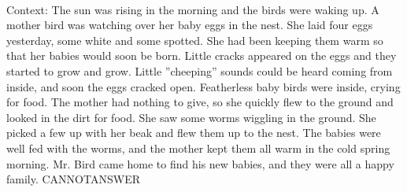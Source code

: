 \documentclass[11pt,a4paper, onecolumn]{article}
\begin{document}
\\ Context: The sun was rising in the morning and the birds were waking up. A mother bird was watching over her baby eggs in the nest. She laid four eggs yesterday, some white and some spotted. She had been keeping them warm so that her babies would soon be born. Little cracks appeared on the eggs and they started to grow and grow. Little ''cheeping'' sounds could be heard coming from inside, and soon the eggs cracked open. Featherless baby birds were inside, crying for food. The mother had nothing to give, so she quickly flew to the ground and looked in the dirt for food. She saw some worms wiggling in the ground. She picked a few up with her beak and flew them up to the nest. The babies were well fed with the worms, and the mother kept them all warm in the cold spring morning. Mr. Bird came home to find his new babies, and they were all a happy family. CANNOTANSWER
\end{document}
